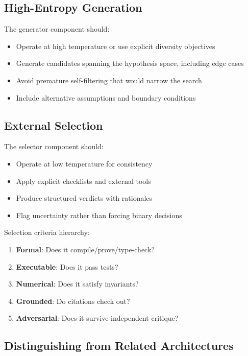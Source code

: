\documentclass[11pt]{article}
\begin{document}
\subsection{High-Entropy Generation}

The generator component should:
\begin{itemize}
    \item Operate at high temperature or use explicit diversity objectives
    \item Generate candidates spanning the hypothesis space, including edge cases
    \item Avoid premature self-filtering that would narrow the search
    \item Include alternative assumptions and boundary conditions
\end{itemize}

\subsection{External Selection}

The selector component should:
\begin{itemize}
    \item Operate at low temperature for consistency
    \item Apply explicit checklists and external tools
    \item Produce structured verdicts with rationales
    \item Flag uncertainty rather than forcing binary decisions
\end{itemize}

Selection criteria hierarchy:
\begin{enumerate}
    \item \textbf{Formal}: Does it compile/prove/type-check?
    \item \textbf{Executable}: Does it pass tests?
    \item \textbf{Numerical}: Does it satisfy invariants?
    \item \textbf{Grounded}: Do citations check out?
    \item \textbf{Adversarial}: Does it survive independent critique?
\end{enumerate}

\subsection{Distinguishing from Related Architectures}
\end{document}
